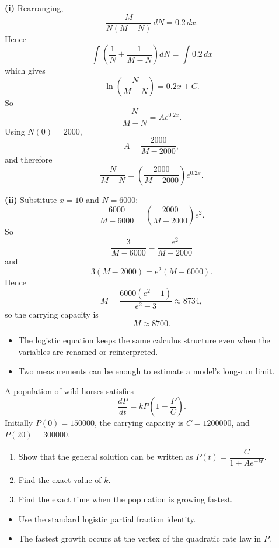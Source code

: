\begin{solution}
\textbf{(i)} Rearranging,
\[
\frac{M}{N(M-N)}\,dN=0.2\,dx.
\]
Hence
\[
\int\left(\frac1N+\frac1{M-N}\right)dN=\int 0.2\,dx
\]
which gives
\[
\ln\left(\frac{N}{M-N}\right)=0.2x+C.
\]
So
\[
\frac{N}{M-N}=Ae^{0.2x}.
\]
Using $N(0)=2000$,
\[
A=\frac{2000}{M-2000},
\]
and therefore
\[
\boxed{\frac{N}{M-N}=\left(\frac{2000}{M-2000}\right)e^{0.2x}}.
\]

\textbf{(ii)} Substitute $x=10$ and $N=6000$:
\[
\frac{6000}{M-6000}=\left(\frac{2000}{M-2000}\right)e^2.
\]
So
\[
\frac{3}{M-6000}=\frac{e^2}{M-2000}
\]
and
\[
3(M-2000)=e^2(M-6000).
\]
Hence
\[
M=\frac{6000(e^2-1)}{e^2-3}\approx 8734,
\]
so the carrying capacity is
\[
\boxed{M\approx 8700}.
\]
\end{solution}

\begin{takeaways}
\begin{itemize}[leftmargin=*]
    \item The logistic equation keeps the same calculus structure even when the variables are renamed or reinterpreted.
    \item Two measurements can be enough to estimate a model's long-run limit.
\end{itemize}
\end{takeaways}

\begin{problem}
A population of wild horses satisfies
\[
\frac{dP}{dt}=kP\left(1-\frac{P}{C}\right).
\]
Initially $P(0)=150000$, the carrying capacity is $C=1200000$, and $P(20)=300000$.
\begin{enumerate}
    \item[\textbf{i}] Show that the general solution can be written as $P(t)=\dfrac{C}{1+Ae^{-kt}}$.
    \item[\textbf{ii}] Find the exact value of $k$.
    \item[\textbf{iii}] Find the exact time when the population is growing fastest.
\end{enumerate}
\end{problem}

\begin{hint}
\begin{itemize}[leftmargin=*]
    \item Use the standard logistic partial fraction identity.
    \item The fastest growth occurs at the vertex of the quadratic rate law in $P$.
\end{itemize}
\end{hint}

